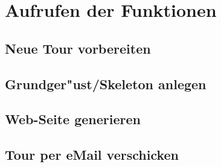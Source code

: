 \section{Aufrufen der Funktionen}\label{sec:ant-calls}

\subsection{Neue Tour vorbereiten}

\subsection{Grundger"ust/Skeleton anlegen}

\subsection{Web-Seite generieren}

\subsection{Tour per eMail verschicken}